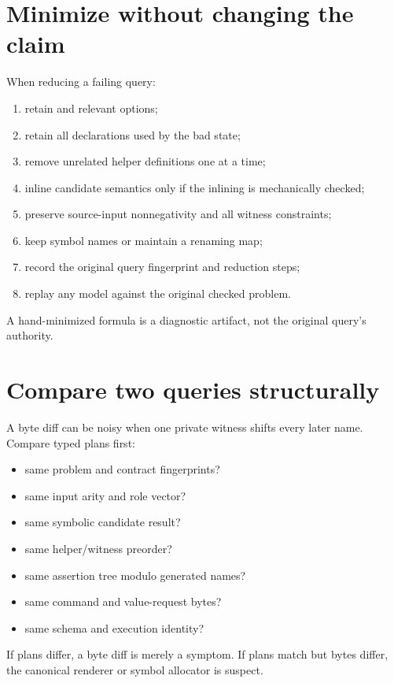 \documentclass[10pt,letterpaper,oneside]{report}
\newcommand{\code}[1]{\texttt{\detokenize{#1}}}
\begin{document}
\section{Minimize without changing the claim}

When reducing a failing query:

\begin{enumerate}
\item retain \code{set-logic} and relevant options;
\item retain all declarations used by the bad state;
\item remove unrelated helper definitions one at a time;
\item inline candidate semantics only if the inlining is mechanically checked;
\item preserve source-input nonnegativity and all witness constraints;
\item keep symbol names or maintain a renaming map;
\item record the original query fingerprint and reduction steps;
\item replay any model against the original checked problem.
\end{enumerate}

A hand-minimized formula is a diagnostic artifact, not the original query's authority.

\section{Compare two queries structurally}

A byte diff can be noisy when one private witness shifts every later name. Compare typed plans first:

\begin{itemize}
\item same problem and contract fingerprints?
\item same input arity and role vector?
\item same symbolic candidate result?
\item same helper/witness preorder?
\item same assertion tree modulo generated names?
\item same command and value-request bytes?
\item same schema and execution identity?
\end{itemize}

If plans differ, a byte diff is merely a symptom. If plans match but bytes differ, the canonical renderer or symbol allocator is suspect.
\end{document}
